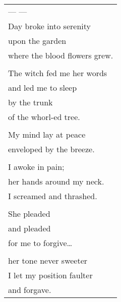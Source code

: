 \documentclass{article}
\begin{document}
\begin{tabular}{l}
\\
--- --- \\
Day broke into serenity \\
upon the garden \\
where the blood flowers grew. \\
\\
The witch fed me her words \\
and led me to sleep \\
by the trunk \\
of the whorl-ed tree. \\
\\
My mind lay at peace \\
enveloped by the breeze. \\
\\
I awoke in pain; \\
her hands around my neck. \\
I screamed and thrashed. \\
\\
She pleaded \\
and pleaded \\
for me to forgive\ldots{} \\
\\
her tone never sweeter \\
I let my position faulter \\
and forgave. \\
\end{tabular} \\
\end{document}
